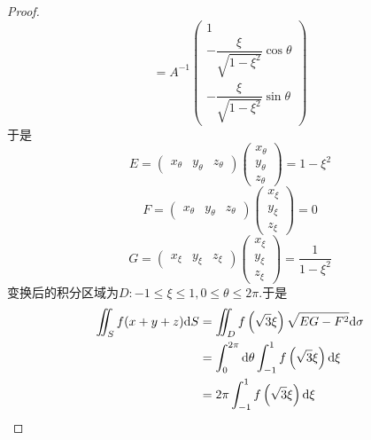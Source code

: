 \documentclass{ctexart}
\begin{document}
\begin{proof}
\[    =A^{-1}\begin{pmatrix}
        1\\-\dfrac{\xi}{\sqrt{1-\xi^2}}\cos\theta\\-\dfrac{\xi}{\sqrt{1-\xi^2}}\sin\theta
    \end{pmatrix}\]
    于是
    \[E=\begin{pmatrix}x_\theta&y_\theta&z_\theta\end{pmatrix}
    \begin{pmatrix}x_\theta\\y_\theta\\z_\theta\end{pmatrix}=1-\xi^2\]
    \[F=\begin{pmatrix}x_\theta&y_\theta&z_\theta\end{pmatrix}
    \begin{pmatrix}x_\xi\\y_\xi\\z_\xi\end{pmatrix}=0\]
    \[G=\begin{pmatrix}x_\xi&y_\xi&z_\xi\end{pmatrix}
    \begin{pmatrix}x_\xi\\y_\xi\\z_\xi\end{pmatrix}=\dfrac{1}{1-\xi^2}\]
    变换后的积分区域为$D:-1\leqslant\xi\leqslant 1,0\leqslant\theta\leqslant2\pi$.于是
    \[\begin{aligned}
        \iint_Sf(x+y+z)\mathrm{d} S
        &= \iint_Df\left(\sqrt3\xi\right)\sqrt{EG-F^2}\mathrm{d}\sigma \\
        &= \int_0^{2\pi}\mathrm{d}\theta\int_{-1}^{1}f\left(\sqrt3\xi\right)\mathrm{d}\xi \\
        &= 2\pi\int_{-1}^{1}f\left(\sqrt3\xi\right)\mathrm{d}\xi
    \end{aligned}\]
\end{proof}
\end{document}
